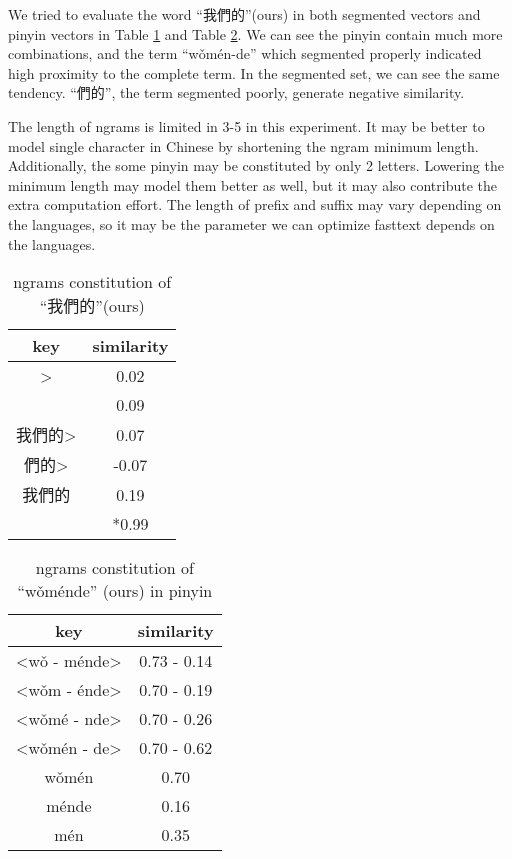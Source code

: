 We tried to evaluate the word \enquote{我們的}(ours) in both segmented vectors and pinyin vectors in Table \ref{table:ngrams-seg} and Table \ref{table:ngrams-pinyin}. 
We can see the pinyin contain much more combinations, and the term \enquote{wǒmén-de} which segmented properly indicated high proximity to the complete term. 
In the segmented set, we can see the same tendency. \enquote{們的}, the term segmented poorly, generate negative similarity. 

The length of ngrams is limited in 3-5 in this experiment. It may be better to model single character in Chinese by shortening the ngram minimum length.
Additionally, the some pinyin may be constituted by only 2 letters.  Lowering the minimum length may model them better as well, but it may also contribute the extra computation effort.
The length of prefix and suffix may vary depending on the languages, so it may be the parameter we can optimize fasttext depends on the languages.

\begin{table}[]
\centering
\caption{ngrams constitution of \enquote{我們的}(ours)}
\label{table:ngrams-seg}
\begin{tabular}{|c|c|}
\hline
 key  &  similarity \\
\hline
{}\textgreater     &  0.02 \\
     &  0.09 \\
我們的\textgreater     &  0.07 \\
們的\textgreater     &  -0.07 \\
我們的     & 0.19   \\
     &  *0.99   \\   
\hline
\end{tabular}
\end{table}

\begin{table}[]
\centering
\caption{ngrams constitution of \enquote{wǒménde} (ours) in pinyin}
\label{table:ngrams-pinyin}
\begin{tabular}{|c|c|}
\hline
 key  &  similarity \\
\hline
\textless wǒ -  ménde\textgreater      &  0.73 - 0.14 \\
\textless wǒm -  énde\textgreater      &  0.70 - 0.19 \\
\textless wǒmé - nde\textgreater     &  0.70 - 0.26 \\
\textless wǒmén - de\textgreater      &  0.70 - 0.62\\
wǒmén      &  0.70 \\
  ménde     & 0.16   \\
mén     &  0.35   \\   
\hline
\end{tabular}
\end{table}

